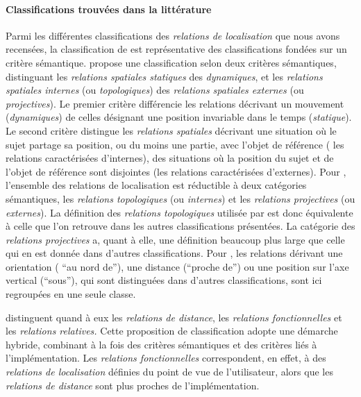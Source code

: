 \paragraph{Classifications trouvées dans la littérature}

Parmi les différentes classifications des \emph{relations de
  localisation} que nous avons recensées, la classification de
\textcite{Borillo1998} est représentative des classifications fondées
sur un critère sémantique. \textcite{Borillo1998} propose une
classification selon deux critères sémantiques, distinguant les
\emph{relations spatiales statiques} des \emph{dynamiques}, et les
\emph{relations spatiales internes} (ou \emph{topologiques}) des
\emph{relations spatiales externes} (ou \emph{projectives}). Le
premier critère différencie les relations décrivant un mouvement
(\emph{dynamiques}) de celles désignant une position invariable dans
le temps (\emph{statique}). Le second critère distingue les
\emph{relations spatiales} décrivant une situation où le sujet partage
sa position, ou du moins une partie, avec l'objet de référence (\ie
les relations caractérisées d'internes), des situations où la position
du sujet et de l'objet de référence sont disjointes (\ie les relations
caractérisées d'externes). Pour \textcite{Borillo1998}, l'ensemble des
relations de localisation est réductible à deux catégories
sémantiques, les \emph{relations topologiques} (ou \emph{internes}) et
les \emph{relations projectives} (ou \emph{externes}). La définition
des \emph{relations topologiques} utilisée par \textcite{Borillo1998}
est donc équivalente à celle que l'on retrouve dans les autres
classifications présentées. La catégorie des \emph{relations
  projectives} a, quant à elle, une définition beaucoup plus large que
celle qui en est donnée dans d'autres classifications. Pour
\textcite{Borillo1998}, les relations dérivant une orientation (\eg
\enquote{au nord de}), une distance (\eg \enquote{proche de}) ou une
position sur l'axe vertical (\eg \enquote{sous}), qui sont distinguées
dans d'autres classifications, sont ici regroupées en une seule
classe.

\textcite{Bateman2010} distinguent quand à eux les \emph{relations de
  distance}, les \emph{relations fonctionnelles} et les
\emph{relations relatives.} Cette proposition de classification adopte
une démarche hybride, combinant à la fois des critères sémantiques et
des critères liés à l'implémentation. Les \emph{relations
  fonctionnelles} correspondent, en effet, à des \emph{relations de
  localisation} définies du point de vue de l'utilisateur, alors que
les \emph{relations de distance} sont plus proches de
l'implémentation.


